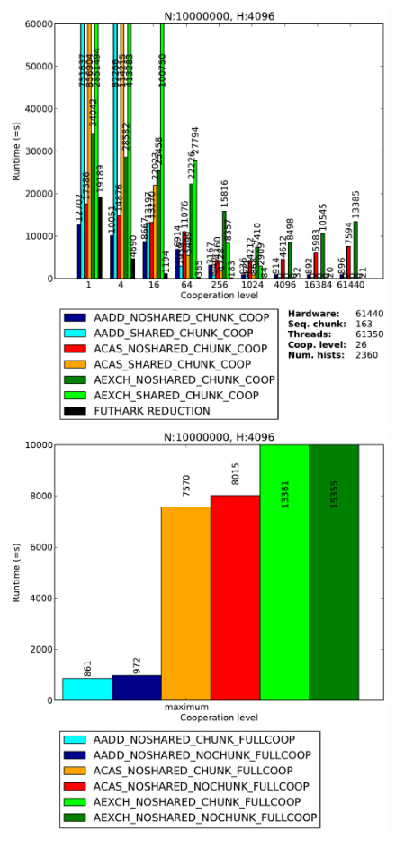 \begin{figure}
\begin{minipage}{0.5\textwidth}
\end{minipage}
\begin{minipage}{0.5\textwidth}
\includegraphics[scale=0.35]{input/content/figures/experiment/hist-4096}
\end{minipage}
\begin{minipage}{0.5\textwidth}
\includegraphics[scale=0.35]{input/content/figures/experiment/hist-4096-full}

\end{minipage}
\end{figure}
